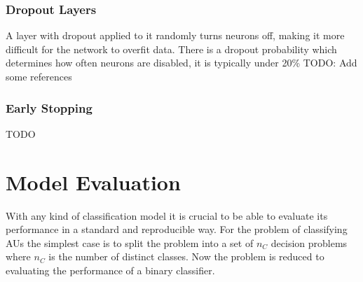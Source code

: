   \subsubsection{Dropout Layers} \label{sec:dropout}
    A layer with dropout applied to it randomly turns neurons off, making it more
    difficult for the network to overfit data. There is a dropout probability
    which determines how often neurons are disabled, it is typically under 20\%
    {\color{red} TODO: Add some references}
  \subsubsection{Early Stopping}
    {\color{red} TODO}
\section{Model Evaluation} \label{sec:eval}
  With any kind of classification model it is crucial to be able to evaluate its
  performance in a standard and reproducible way. For the problem of classifying
  AUs the simplest case is to split the problem into a set of $n_C$ decision problems
  where $n_C$ is the number of distinct classes. Now the problem is reduced to
  evaluating the performance of a binary classifier.


